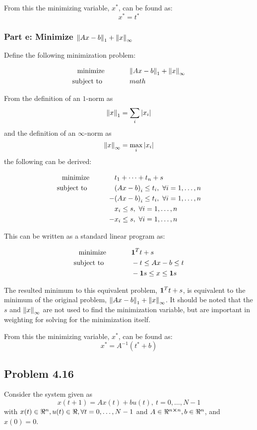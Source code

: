 \documentclass[letter]{article}
\newcommand{\optpblm}[3][eq:default]{
	\begin{equation}\label{#1}
		\begin{aligned}
			\text{minimize} \hspace{0.5in} &#2\vspace{5pt}\\
			\text{subject to \hspace{0.5in}} &#3
		\end{aligned}	
	\end{equation}
}
\begin{document}
From this the minimizing variable, $x^*$, can be found as: $$x^* = t^*$$

\newpage
\subsubsection{Part e: Minimize $\norm{Ax-b}_1 + \norm{x}_\infty$}
Define the following minimization problem:
\optpblm{\norm{Ax-b}_1 + \norm{x}_\infty}{math}
From the definition of an $1$-norm as $$\norm{x}_1 = \sum_i \abs{x_i}$$ and the definition of an $\infty$-norm as $$\norm{x}_\infty = \max_i \abs{x_i}$$ the following can be derived:
\optpblm{t_1 + \cdots + t_n + s}{
		\qty(Ax - b)_i\leq t_i, \ \forall i = 1,\dots,n\\
		-& \qty(Ax - b)_i\leq t_i, \ \forall i = 1,\dots,n\\
		&x_i \leq s, \ \forall i = 1,\dots,n\\
	-	&x_i \leq s, \ \forall i = 1,\dots,n}
This can be written as a standard linear program as:
\optpblm{\vb{1}^T t + s}{
		- t \leq Ax-b \leq t\\
		&-\vb{1}s \leq x \leq \vb{1}s}
The resulted minimum to this equivalent problem, $\vb{1}^T t + s$, is equivalent to the minimum of the original problem, $\norm{Ax-b}_1 + \norm{x}_\infty$. It should be noted that the $s$ and $\norm{x}_\infty$ are not used to find the minimization variable, but are important in weighting for solving for the minimization itself.

From this the minimizing variable, $x^*$, can be found as: $$x^* = A^{-1} (t^* + b)$$


\newpage
\subsection{Problem 4.16}
Consider the system given as
\begin{equation}\label{eq:dyn_sys_def}
	x(t+1) = A x(t) + b u(t), \ t = 0,\dots,N-1
\end{equation}
with $x(t) \in \real^n, u(t) \in \real, \forall t = 0,\dots,N-1$ and $A \in \real^{n\cross n}, b \in \real^n$, and $x(0) = 0$.\\
\end{document}
